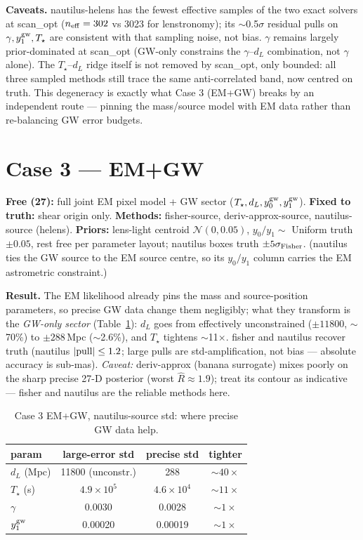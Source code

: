 \documentclass[10pt]{article}
\begin{document}
\textbf{Caveats.} nautilus-helens has the fewest effective samples of the two exact solvers at
scan\_opt ($n_{\rm eff}=302$ vs 3023 for lenstronomy); its $\sim$0.5$\sigma$ residual pulls on
$\gamma,y_1^{\rm gw},T_\star$ are consistent with that sampling noise, not bias. $\gamma$ remains
largely prior-dominated at scan\_opt (GW-only constrains the $\gamma$--$d_L$ combination, not
$\gamma$ alone). The $T_\star$--$d_L$ ridge itself is not removed by scan\_opt, only bounded:
all three sampled methods still trace the same anti-correlated band, now centred on truth. This
degeneracy is exactly what Case 3 (EM+GW) breaks by an independent route --- pinning the
mass/source model with EM data rather than re-balancing GW error budgets.

\section{Case 3 --- EM+GW}
\textbf{Free (27):} full joint EM pixel model + GW sector ($T_\star, d_L, y_0^{\rm gw}, y_1^{\rm gw}$).
\textbf{Fixed to truth:} shear origin only. \textbf{Methods:} fisher-source, deriv-approx-source,
nautilus-source (helens). \textbf{Priors:} lens-light centroid $\mathcal{N}(0,0.05)$,
$y_0/y_1\sim$ Uniform truth$\pm0.05$, rest free per parameter layout; nautilus boxes truth
$\pm5\sigma_{\rm Fisher}$. (nautilus ties the GW source to the EM source centre, so its $y_0/y_1$
column carries the EM astrometric constraint.)

\textbf{Result.} The EM likelihood already pins the mass and source-position parameters, so
precise GW data change them negligibly; what they transform is the \emph{GW-only sector}
(Table~\ref{tab:c3}): $d_L$ goes from effectively unconstrained ($\pm11800$, $\sim$70\%) to
$\pm288$\,Mpc ($\sim$2.6\%), and $T_\star$ tightens $\sim$11$\times$. fisher and nautilus recover
truth (nautilus $|{\rm pull}|\le1.2$; large pulls are std-amplification, not bias --- absolute
accuracy is sub-mas). \emph{Caveat:} deriv-approx (banana surrogate) mixes poorly on the sharp
precise 27-D posterior (worst $\hat R\approx1.9$); treat its contour as indicative --- fisher and
nautilus are the reliable methods here.

\begin{table}[h]\centering\footnotesize
\caption{Case 3 EM+GW, nautilus-source std: where precise GW data help.}
\label{tab:c3}
\begin{tabular}{lccc}
\toprule
param & large-error std & precise std & tighter \\
\midrule
$d_L$ (Mpc)    & 11800 (unconstr.) & 288    & $\sim40\times$ \\
$T_\star$ (s)  & $4.9\times10^5$   & $4.6\times10^4$ & $\sim11\times$ \\
$\gamma$       & 0.0030 & 0.0028 & $\sim1\times$ \\
$y_1^{\rm gw}$ & 0.00020 & 0.00019 & $\sim1\times$ \\
\bottomrule
\end{tabular}
\end{table}
\end{document}
